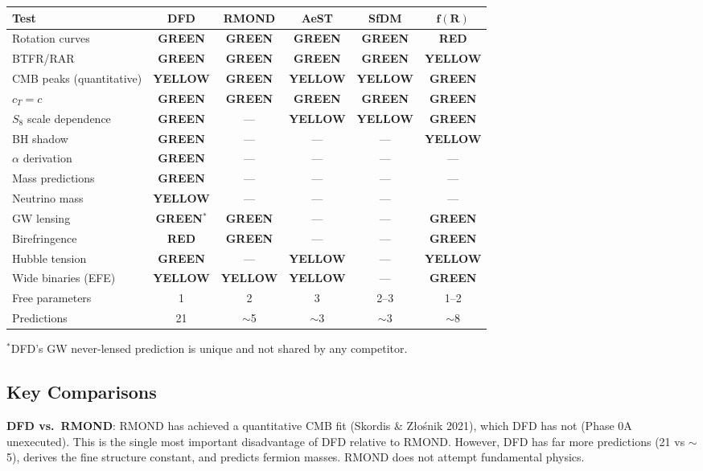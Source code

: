 \documentclass[11pt,a4paper]{article}
\newcommand{\GREEN}{\textcolor{dfdgreen}{\textbf{GREEN}}}
\newcommand{\YELLOW}{\textcolor{dfdyellow}{\textbf{YELLOW}}}
\newcommand{\RED}{\textcolor{dfdred}{\textbf{RED}}}
\begin{document}
\begin{center}
\begin{longtable}{p{3.5cm}ccccc}
\toprule
\textbf{Test} & \textbf{DFD} & \textbf{RMOND} & \textbf{AeST} & \textbf{SfDM} & $\mathbf{f(R)}$ \\
\midrule
Rotation curves & \GREEN & \GREEN & \GREEN & \GREEN & \RED \\
BTFR/RAR & \GREEN & \GREEN & \GREEN & \GREEN & \YELLOW \\
CMB peaks (quantitative) & \YELLOW & \GREEN & \YELLOW & \YELLOW & \GREEN \\
$c_T = c$ & \GREEN & \GREEN & \GREEN & \GREEN & \GREEN \\
$S_8$ scale dependence & \GREEN & --- & \YELLOW & \YELLOW & \GREEN \\
BH shadow & \GREEN & --- & --- & --- & \YELLOW \\
$\alpha$ derivation & \GREEN & --- & --- & --- & --- \\
Mass predictions & \GREEN & --- & --- & --- & --- \\
Neutrino mass & \YELLOW & --- & --- & --- & --- \\
GW lensing & \GREEN$^*$ & \GREEN & --- & --- & \GREEN \\
Birefringence & \RED & \GREEN & --- & --- & \GREEN \\
Hubble tension & \GREEN & --- & \YELLOW & --- & \YELLOW \\
Wide binaries (EFE) & \YELLOW & \YELLOW & \YELLOW & --- & \GREEN \\
Free parameters & 1 & 2 & 3 & 2--3 & 1--2 \\
Predictions & 21 & $\sim$5 & $\sim$3 & $\sim$3 & $\sim$8 \\
\bottomrule
\end{longtable}
\end{center}

$^*$DFD's GW never-lensed prediction is unique and not shared by any competitor.

\subsection{Key Comparisons}

\textbf{DFD vs.\ RMOND}: RMOND has achieved a quantitative CMB fit (Skordis \& Z{\l}o\'snik 2021), which DFD has not (Phase 0A unexecuted). This is the single most important disadvantage of DFD relative to RMOND. However, DFD has far more predictions (21 vs $\sim$5), derives the fine structure constant, and predicts fermion masses. RMOND does not attempt fundamental physics.
\end{document}
